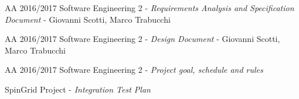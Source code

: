 \begin{thebibliography}{9}

	AA 2016/2017 Software Engineering 2 - \emph{Requirements Analysis and Specification Document} - Giovanni Scotti, Marco Trabucchi

	AA 2016/2017 Software Engineering 2 - \emph{Design Document} - Giovanni Scotti, Marco Trabucchi
	
	AA 2016/2017 Software Engineering 2 - \emph{Project goal, schedule and rules}
	
	SpinGrid Project - \emph{Integration Test Plan}

\end{thebibliography}